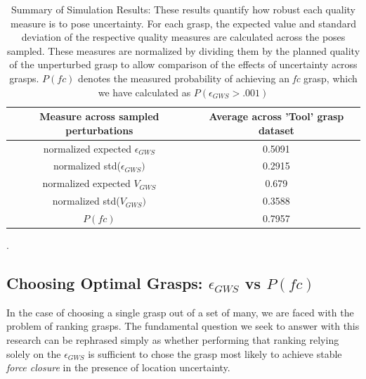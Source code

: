 \begin{table}
\begin{tabular}{ |c |c |}
\hline
Measure across sampled perturbations&Average across 'Tool' grasp dataset\\ \hline
normalized expected ${\epsilon}_{GWS}$&0.5091 \\ \hline
normalized std(${\epsilon}_{GWS})$&0.2915 \\ \hline
normalized expected $V_{GWS}$&0.679 \\ \hline
normalized std($V_{GWS})$&0.3588 \\ \hline
$P(fc)$&0.7957\\ \hline
\end{tabular}
\caption{Summary of Simulation Results: These results quantify how robust each quality measure is to pose uncertainty. For each grasp, the expected value and standard deviation of the respective quality measures are calculated across the poses sampled.  These measures are normalized by dividing them by the planned quality of the unperturbed grasp to allow comparison of the effects of uncertainty across grasps. $P(fc)$ denotes the measured probability of achieving an \emph{fc} grasp, which we have calculated as $P(\epsilon_{GWS} >.001) $ }.
\label{tab:expresultbrief}
\end{table}

\subsection{Choosing Optimal Grasps: $\epsilon_{GWS}$ vs $P(fc)$}
In the case of choosing a single grasp out of a set of many, we are faced with the problem of ranking grasps. The fundamental question we seek to answer with this research can be rephrased simply as whether performing that ranking relying solely on the $\epsilon_{GWS}$ is sufficient to chose the grasp most likely to achieve stable \emph{force closure} in the presence of location uncertainty. 


